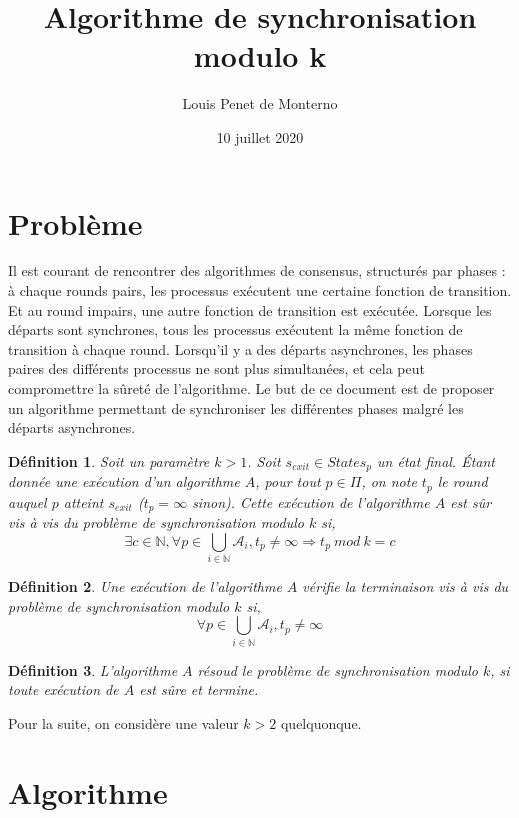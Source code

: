 \documentclass{article}
\title{Algorithme de synchronisation modulo k}
\date{10 juillet 2020}
\author{Louis Penet de Monterno}
\newtheorem{definition}{Définition}
\begin{document}
\maketitle

\section{Problème}

Il est courant de rencontrer des algorithmes de consensus, structurés par phases : 
à chaque rounds pairs, les processus exécutent une certaine fonction de transition. Et au round impairs, une autre fonction de transition est exécutée.
Lorsque les départs sont synchrones, tous les processus exécutent la même fonction de transition à chaque round.
Lorsqu'il y a des départs asynchrones, les phases paires des différents processus ne sont plus simultanées, et cela peut compromettre la sûreté de l'algorithme.
Le but de ce document est de proposer un algorithme permettant de synchroniser les différentes phases malgré les départs asynchrones.

\begin{definition}

	Soit un paramètre $k > 1$. Soit $s_{exit} \in States_p$ un état final.
	Étant donnée une exécution d'un algorithme $A$, pour tout $p \in \Pi$, on note $t_p$ le round auquel $p$ atteint $s_{exit}$ ($t_p = \infty$ sinon).
	Cette exécution de l'algorithme $A$ est sûr vis à vis du problème de synchronisation modulo $k$ si,
	$$\exists c \in \mathds{N}, \forall p \in \bigcup\limits_{i \in \mathds{N}} \mathcal{A}_i, t_p \neq \infty \Rightarrow t_p~mod~k = c$$

\end{definition}

\begin{definition}

	Une exécution de l'algorithme $A$ vérifie la terminaison vis à vis du problème de synchronisation modulo $k$ si,
	$$\forall p \in \bigcup\limits_{i \in \mathds{N}} \mathcal{A}_i, t_p \neq \infty$$

\end{definition}
\begin{definition}
	L'algorithme $A$ résoud le problème de synchronisation modulo $k$, si toute exécution de $A$ est sûre et termine.
\end{definition}

Pour la suite, on considère une valeur $k > 2$ quelquonque.

\section{Algorithme}
\end{document}

